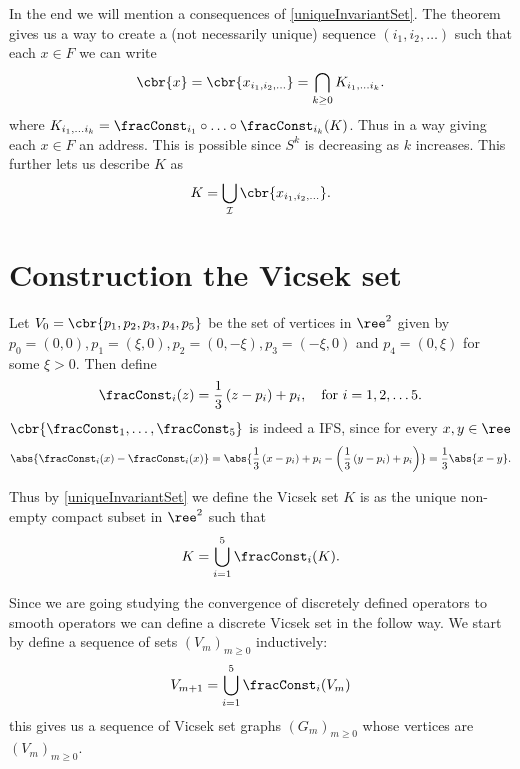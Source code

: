 In the end we will mention a consequences of \cref{uniqueInvariantSet}. The theorem gives us a way to create a (not necessarily unique) sequence $(i_1, i_2, \ldots)$ such that each $x \in F$ we can write
\begin{equation}\label{pointAsIntersectSet}
	\cbr{x} = \cbr{x_{i_1, i_2, \ldots}} = \bigcap_{k \geq 0} K_{i_1, \ldots i_k}.
\end{equation}
where $K_{i_1, \ldots i_k} = \fracConst_{i_1} \circ \ldots \circ \fracConst_{i_k}(K)$. Thus in a way giving each $x \in F$ an address. This is possible since $S^{k}$ is decreasing as $k$ increases. This further lets us describe $K$ as
\begin{equation}\label{InvSetAsPoint}
	K = \bigcup_{\mathcal{I}} \cbr{x_{i_1, i_2, \ldots}}.
\end{equation}


\section{Construction the Vicsek set}

Let $V_0 = \cbr{p_1, p_2, p_3, p_4, p_5}$ be the set of vertices  in $\ree^{2}$ given by $p_0 = (0,0), p_1=(\xi, 0), p_2 = (0, -\xi), p_3 = (-\xi, 0)$ and $p_4 = (0, \xi)$ for some $\xi > 0$. Then define
\begin{equation}
	\fracConst_i(z) = \frac{1}{3} \left(z - p_i\right) +p_i, \quad \text{for } i = 1,2,\ldots 5.
\end{equation}
$\cbr{\fracConst_{1}, \ldots, \fracConst_{5}}$ is indeed a IFS, since for every $x, y \in \ree$
\begin{equation}
	\abs{\fracConst_{i}(x)-\fracConst_{i}(x)} = \abs{\frac{1}{3} \left(x - p_i\right) +p_i - \left(\frac{1}{3} \left(y - p_i\right) +p_i\right)} =\frac{1}{3}\abs{x-y}.
\end{equation}

Thus by \cref{uniqueInvariantSet} we define the Vicsek set $K$ is as the unique non-empty compact subset in $\ree^{2}$ such that
\begin{equation}
	K = \bigcup_{i = 1}^{5} \fracConst_i(K).
\end{equation}

Since we are going studying the convergence of discretely defined operators to smooth operators we can define a discrete Vicsek set in the follow way. We start by define a sequence of sets $(V_m)_{m \geq 0}$ inductively:
\begin{equation}
	V_{m+1} = \bigcup_{i = 1}^{5} \fracConst_i(V_m)
\end{equation}
this gives us a sequence of Vicsek set graphs $(G_m)_{m\geq 0}$ whose vertices are $(V_m)_{m \geq 0}$. 

